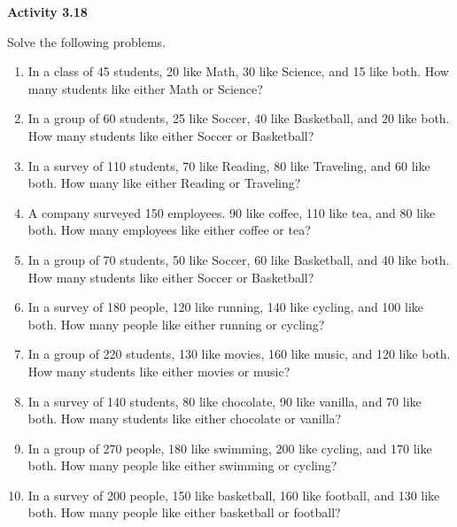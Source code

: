 \vspace{0.3ex}
\noindent\textbf{Activity 3.18}

\vspace{0.2ex}

Solve the following problems. 

\begin{enumerate}[label=\color{blue}\arabic*.]
    \item In a class of 45 students, 20 like Math, 30 like Science, and 15 like both. How many students like either Math or Science?
    \item In a group of 60 students, 25 like Soccer, 40 like Basketball, and 20 like both. How many students like either Soccer or Basketball?
    \item In a survey of 110 students, 70 like Reading, 80 like Traveling, and 60 like both. How many like either Reading or Traveling?
    \item A company surveyed 150 employees. 90 like coffee, 110 like tea, and 80 like both. How many employees like either coffee or tea?
    \item In a group of 70 students, 50 like Soccer, 60 like Basketball, and 40 like both. How many students like either Soccer or Basketball?
    \item In a survey of 180 people, 120 like running, 140 like cycling, and 100 like both. How many people like either running or cycling?
    \item In a group of 220 students, 130 like movies, 160 like music, and 120 like both. How many students like either movies or music?
    \item In a survey of 140 students, 80 like chocolate, 90 like vanilla, and 70 like both. How many students like either chocolate or vanilla?
    \item In a group of 270 people, 180 like swimming, 200 like cycling, and 170 like both. How many people like either swimming or cycling?
    \item In a survey of 200 people, 150 like basketball, 160 like football, and 130 like both. How many people like either basketball or football?
\end{enumerate}
